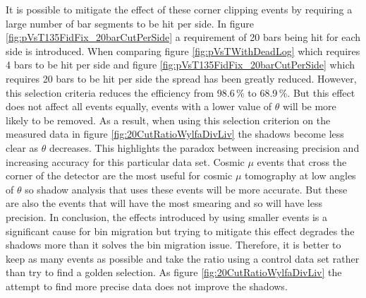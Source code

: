 

It is possible to mitigate the effect of these corner clipping events by requiring a large number of bar segments to be hit per side. In figure \ref{fig:pVsT135FidFix_20barCutPerSide} a requirement of 20 bars being hit for each side is introduced. When comparing figure \ref{fig:pVsTWithDeadLog} which requires 4 bars to be hit per side and figure \ref{fig:pVsT135FidFix_20barCutPerSide} which requires 20 bars to be hit per side the spread has been greatly reduced. However, this selection criteria reduces the efficiency from 98.6\,\% to 68.9\,\%. But this effect does not affect all events equally, events with a lower value of $\theta$ will be more likely to be removed. As a result, when using this selection criterion on the measured data in figure \ref{fig:20CutRatioWylfaDivLiv} the shadows become less clear as $\theta$ decreases. This highlights the paradox between increasing precision and increasing accuracy for this particular data set. Cosmic $\mu$ events that cross the corner of the detector are the most useful for cosmic $\mu$ tomography at low angles of $\theta$ so shadow analysis that uses these events will be more accurate. But these are also the events that will have the most smearing and so will have less precision. In conclusion, the effects introduced by using smaller events is a significant cause for bin migration but trying to mitigate this effect degrades the shadows more than it solves the bin migration issue. Therefore, it is better to keep as many events as possible and take the ratio using a control data set rather than try to find a golden selection. As figure \ref{fig:20CutRatioWylfaDivLiv} the attempt to find more precise data does not improve the shadows.

